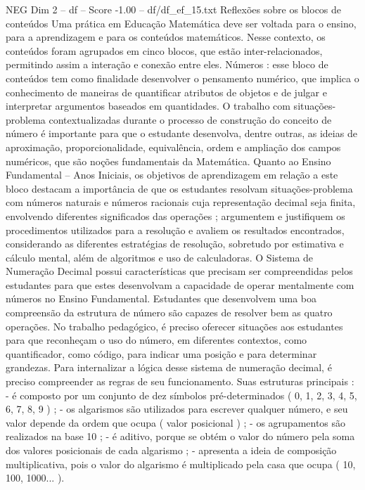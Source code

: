 \begin{textsample}{NEG Dim 2 – df – Score -1.00 – df/df\_ef\_15.txt}  \label{ex:f2_neg_161}
Reflexões sobre os blocos de conteúdos Uma prática em Educação Matemática deve ser voltada para o ensino, para a aprendizagem e para os conteúdos matemáticos.
Nesse contexto, os conteúdos foram agrupados em cinco blocos, que estão inter-relacionados, permitindo assim a interação e conexão entre eles.
Números : esse bloco de conteúdos tem como finalidade desenvolver o pensamento numérico, que implica o conhecimento de maneiras de quantificar atributos de objetos e de julgar e interpretar argumentos baseados em quantidades.
O trabalho com situações-problema contextualizadas durante o processo de construção do conceito de número é importante para que o estudante desenvolva, dentre outras, as ideias de aproximação, proporcionalidade, equivalência, ordem e ampliação dos campos numéricos, que são noções fundamentais da Matemática.
Quanto ao Ensino Fundamental – Anos Iniciais, os objetivos de aprendizagem em relação a este bloco destacam a importância de que os estudantes resolvam situações-problema com números naturais e números racionais cuja representação decimal seja finita, envolvendo diferentes significados das operações ; argumentem e justifiquem os procedimentos utilizados para a resolução e avaliem os resultados encontrados, considerando as diferentes estratégias de resolução, sobretudo por estimativa e cálculo mental, além de algoritmos e uso de calculadoras.
O Sistema de Numeração Decimal possui características que precisam ser compreendidas pelos estudantes para que estes desenvolvam a capacidade de operar mentalmente com números no Ensino Fundamental.
Estudantes que desenvolvem uma boa compreensão da estrutura de número são capazes de resolver bem as quatro operações.
No trabalho pedagógico, é preciso oferecer situações aos estudantes para que reconheçam o uso do número, em diferentes contextos, como quantificador, como código, para indicar uma posição e para determinar grandezas.
Para internalizar a lógica desse sistema de numeração decimal, é preciso compreender as regras de seu funcionamento.
Suas estruturas principais : - é composto por um conjunto de dez símbolos pré-determinados ( 0, 1, 2, 3, 4, 5, 6, 7, 8, 9 ) ; - os algarismos são utilizados para escrever qualquer número, e seu valor depende da ordem que ocupa ( valor posicional ) ; - os agrupamentos são realizados na base 10 ; - é aditivo, porque se obtém o valor do número pela soma dos valores posicionais de cada algarismo ; - apresenta a ideia de composição multiplicativa, pois o valor do algarismo é multiplicado pela casa que ocupa ( 10, 100, 1000... ).

\end{textsample}
